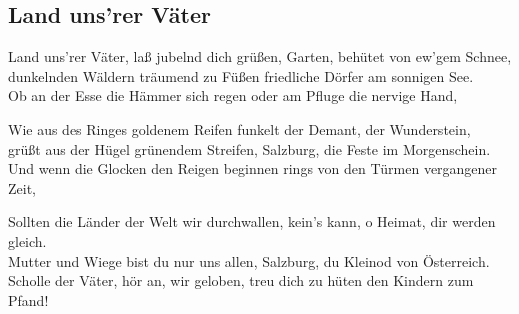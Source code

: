 
\subsection*{Land uns'rer Väter}
%
%

\thestrophe Land uns'rer Väter, laß jubelnd dich grüßen, Garten, behütet von ew'gem Schnee, \\
dunkelnden Wäldern träumend zu Füßen friedliche Dörfer am sonnigen See. \\
Ob an der Esse die Hämmer sich regen oder am Pfluge die nervige Hand, \\

\thestrophe Wie aus des Ringes goldenem Reifen funkelt der Demant, der Wunderstein, \\
grüßt aus der Hügel grünendem Streifen, Salzburg, die Feste im Morgenschein. \\
Und wenn die Glocken den Reigen beginnen rings von den Türmen vergangener Zeit, \\

\thestrophe Sollten die Länder der Welt wir durchwallen, kein's kann, o Heimat, dir werden gleich. \\
Mutter und Wiege bist du nur uns allen, Salzburg, du Kleinod von Österreich. \\
Scholle der Väter, hör an, wir geloben, treu dich zu hüten den Kindern zum Pfand! \\
